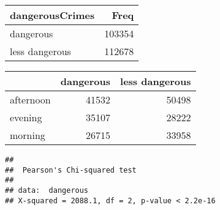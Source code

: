 \documentclass[
]{article}
\begin{document}
\begin{longtable}[]{@{}lr@{}}
\toprule
dangerousCrimes & Freq\tabularnewline
\midrule
\endhead
dangerous & 103354\tabularnewline
less dangerous & 112678\tabularnewline
\bottomrule
\end{longtable}

\begin{longtable}[]{@{}lrr@{}}
\toprule
& dangerous & less dangerous\tabularnewline
\midrule
\endhead
afternoon & 41532 & 50498\tabularnewline
evening & 35107 & 28222\tabularnewline
morning & 26715 & 33958\tabularnewline
\bottomrule
\end{longtable}

\begin{verbatim}
## 
##  Pearson's Chi-squared test
## 
## data:  dangerous
## X-squared = 2088.1, df = 2, p-value < 2.2e-16
\end{verbatim}
\end{document}
